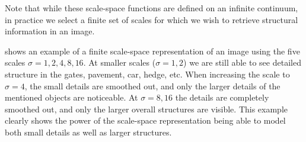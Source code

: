 \documentclass[thesis.tex]{subfiles}
\begin{document}
Note that while these scale-space functions are defined on an infinite continuum, in practice we select a finite set of scales for which we wish to retrieve structural information in an image.

 shows an example of a finite scale-space representation of an image using the five scales $\sigma = 1,2,4,8,16$. At smaller scales ($\sigma = 1,2$) we are still able to see detailed structure in the gates, pavement, car, hedge, etc. When increasing the scale to $\sigma = 4$, the small details are smoothed out, and only the larger details of the mentioned objects are noticeable. At $\sigma = 8, 16$ the details are completely smoothed out, and only the larger overall structures are visible. This example clearly shows the power of the scale-space representation being able to model both small details as well as larger structures.
%
\end{document}
